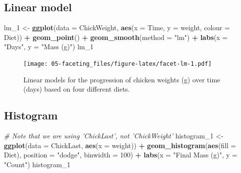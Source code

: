 \documentclass[]{book}
\newenvironment{Shaded}{\begin{snugshade}}{\end{snugshade}}
\newcommand{\KeywordTok}[1]{\textcolor[rgb]{0.13,0.29,0.53}{\textbf{#1}}}
\newcommand{\DataTypeTok}[1]{\textcolor[rgb]{0.13,0.29,0.53}{#1}}
\newcommand{\DecValTok}[1]{\textcolor[rgb]{0.00,0.00,0.81}{#1}}
\newcommand{\StringTok}[1]{\textcolor[rgb]{0.31,0.60,0.02}{#1}}
\newcommand{\CommentTok}[1]{\textcolor[rgb]{0.56,0.35,0.01}{\textit{#1}}}
\newcommand{\OperatorTok}[1]{\textcolor[rgb]{0.81,0.36,0.00}{\textbf{#1}}}
\newcommand{\NormalTok}[1]{#1}
\theoremstyle{definition}
\theoremstyle{definition}
\theoremstyle{definition}
\theoremstyle{remark}
\begin{document}
\subsection{Linear model}\label{linear-model}

\begin{Shaded}
\begin{Highlighting}[]
\NormalTok{lm_}\DecValTok{1}\NormalTok{ <-}\StringTok{ }\KeywordTok{ggplot}\NormalTok{(}\DataTypeTok{data =}\NormalTok{ ChickWeight, }\KeywordTok{aes}\NormalTok{(}\DataTypeTok{x =}\NormalTok{ Time, }\DataTypeTok{y =}\NormalTok{ weight, }\DataTypeTok{colour =}\NormalTok{ Diet)) }\OperatorTok{+}
\StringTok{  }\KeywordTok{geom_point}\NormalTok{() }\OperatorTok{+}
\StringTok{  }\KeywordTok{geom_smooth}\NormalTok{(}\DataTypeTok{method =} \StringTok{"lm"}\NormalTok{) }\OperatorTok{+}
\StringTok{  }\KeywordTok{labs}\NormalTok{(}\DataTypeTok{x =} \StringTok{"Days"}\NormalTok{, }\DataTypeTok{y =} \StringTok{"Mass (g)"}\NormalTok{)}
\NormalTok{lm_}\DecValTok{1}
\end{Highlighting}
\end{Shaded}

\begin{figure}
\centering
\texttt{[image: 05-faceting\_files/figure-latex/facet-lm-1.pdf]}
\caption{\label{fig:facet-lm}Linear models for the progression of chicken
weights (g) over time (days) based on four different diets.}
\end{figure}

\subsection{Histogram}\label{histogram}

\begin{Shaded}
\begin{Highlighting}[]
\CommentTok{# Note that we are using 'ChickLast', not 'ChickWeight'}
\NormalTok{histogram_}\DecValTok{1}\NormalTok{ <-}\StringTok{ }\KeywordTok{ggplot}\NormalTok{(}\DataTypeTok{data =}\NormalTok{ ChickLast, }\KeywordTok{aes}\NormalTok{(}\DataTypeTok{x =}\NormalTok{ weight)) }\OperatorTok{+}
\StringTok{  }\KeywordTok{geom_histogram}\NormalTok{(}\KeywordTok{aes}\NormalTok{(}\DataTypeTok{fill =}\NormalTok{ Diet), }\DataTypeTok{position =} \StringTok{"dodge"}\NormalTok{, }\DataTypeTok{binwidth =} \DecValTok{100}\NormalTok{) }\OperatorTok{+}
\StringTok{  }\KeywordTok{labs}\NormalTok{(}\DataTypeTok{x =} \StringTok{"Final Mass (g)"}\NormalTok{, }\DataTypeTok{y =} \StringTok{"Count"}\NormalTok{)}
\NormalTok{histogram_}\DecValTok{1}
\end{Highlighting}
\end{Shaded}
\end{document}
